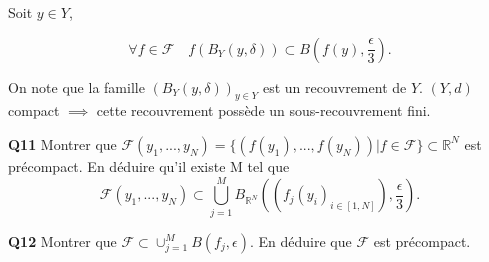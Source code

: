 \documentclass[french]{article}
\begin{document}
	Soit $y \in Y$,
	
	\[\forall f \in \mathcal{F} \quad f(B_Y(y, \delta)) \subset B\left(f(y), \frac{\epsilon}{3}\right).\]
	
	On note que la famille $(B_Y(y, \delta))_{y \in Y}$ est un recouvrement de $Y$. $(Y,d)$ compact $\implies$ cette recouvrement possède un sous-recouvrement fini.

	\begin{tcolorbox}[colback=gray!5!white,colframe=gray!75!black]
		\textbf{\large{Q11}} Montrer que $\mathcal{F}(y_1,...,y_N) = \{(f(y_1),...,f(y_N)) | f \in \mathcal{F}\} \subset \mathbb{R}^N$ est précompact. En déduire qu'il existe M tel que
		\[\mathcal{F}(y_1,...,y_N) \subset \bigcup_{j=1}^{M}B_{\mathbb{R}^N}\left((f_j(y_i)_{i\in[1,N]}), \frac{\epsilon}{3}\right).\]
	\end{tcolorbox}

	

	\begin{tcolorbox}[colback=gray!5!white,colframe=gray!75!black]
		\textbf{\large{Q12}} Montrer que $\mathcal{F} \subset \cup_{j=1}^{M} B(f_j, \epsilon)$. En déduire que $\mathcal{F}$ est précompact.
	\end{tcolorbox}
	
\end{document}
